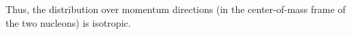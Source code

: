 Thus, the distribution over momentum directions (in the center-of-mass frame of the two nucleons) is isotropic.
